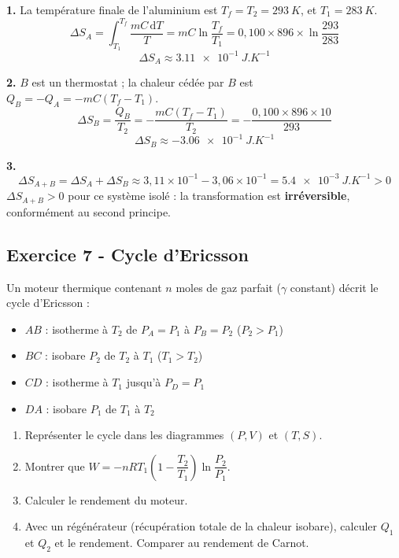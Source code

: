 \documentclass[12pt,a4paper]{article}
\begin{document}
\begin{boitecorrige}
\textbf{1.} La température finale de l'aluminium est $T_f = T_2 = \qty{293}{K}$, et $T_1 = \qty{283}{K}$.
\[
\Delta S_A = \int_{T_1}^{T_f}\frac{mC\,\mathrm{d}T}{T} = mC\ln\frac{T_f}{T_1} = 0{,}100\times896\times\ln\frac{293}{283}
\]
\[
\boxed{\Delta S_A \approx \qty{3.11e-1}{J.K^{-1}}}
\]

\textbf{2.} $B$ est un thermostat ; la chaleur cédée par $B$ est $Q_B = -Q_A = -mC(T_f-T_1)$.
\[
\Delta S_B = \frac{Q_B}{T_2} = -\frac{mC(T_f-T_1)}{T_2} = -\frac{0{,}100\times896\times10}{293}
\]
\[
\boxed{\Delta S_B \approx -\qty{3.06e-1}{J.K^{-1}}}
\]

\textbf{3.}
\[
\Delta S_{A+B} = \Delta S_A + \Delta S_B \approx 3{,}11\times10^{-1} - 3{,}06\times10^{-1} = \qty{5.4e-3}{J.K^{-1}} > 0
\]
$\Delta S_{A+B} > 0$ pour ce système isolé : la transformation est \textbf{irréversible}, conformément au second principe.
\end{boitecorrige}

\subsection*{Exercice 7 - Cycle d'Ericsson \niveau{\difficile}}

\begin{boiteexercice}
Un moteur thermique contenant $n$ moles de gaz parfait ($\gamma$ constant) décrit le cycle d'Ericsson :
\begin{itemize}[nosep]
  \item $AB$ : isotherme à $T_2$ de $P_A=P_1$ à $P_B=P_2$ ($P_2>P_1$)
  \item $BC$ : isobare $P_2$ de $T_2$ à $T_1$ ($T_1>T_2$)
  \item $CD$ : isotherme à $T_1$ jusqu'à $P_D=P_1$
  \item $DA$ : isobare $P_1$ de $T_1$ à $T_2$
\end{itemize}
\begin{enumerate}
  \item Représenter le cycle dans les diagrammes $(P,V)$ et $(T,S)$.
  \item Montrer que $W = -nRT_1\!\left(1-\dfrac{T_2}{T_1}\right)\ln\dfrac{P_2}{P_1}$.
  \item Calculer le rendement du moteur.
  \item Avec un régénérateur (récupération totale de la chaleur isobare), calculer $Q_1$ et $Q_2$ et le rendement. Comparer au rendement de Carnot.
\end{enumerate}
\end{boiteexercice}
\end{document}

